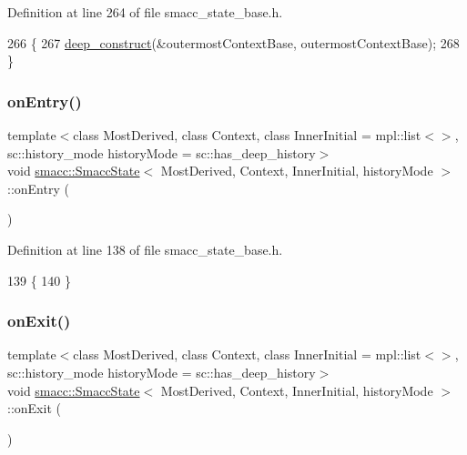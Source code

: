 Definition at line 264 of file smacc\+\_\+state\+\_\+base.\+h.


\begin{DoxyCode}
266     \{
267       \hyperlink{classsmacc_1_1SmaccState_aac23d8a6909f75c5e5fca2a7c09b5368}{deep\_construct}(&outermostContextBase, outermostContextBase);
268     \}
\end{DoxyCode}
\mbox{\label{classsmacc_1_1SmaccState_a4a10a74fdbe51a798b8d651668b8ed9a}} 
\subsubsection{\texorpdfstring{on\+Entry()}{onEntry()}}
{\footnotesize\ttfamily template$<$class Most\+Derived, class Context, class Inner\+Initial = mpl\+::list$<$$>$, sc\+::history\+\_\+mode history\+Mode = sc\+::has\+\_\+deep\+\_\+history$>$ \\
void \hyperlink{classsmacc_1_1SmaccState}{smacc\+::\+Smacc\+State}$<$ Most\+Derived, Context, Inner\+Initial, history\+Mode $>$\+::on\+Entry (\begin{DoxyParamCaption}{ }\end{DoxyParamCaption})\hspace{0.3cm}{\ttfamily [inline]}}



Definition at line 138 of file smacc\+\_\+state\+\_\+base.\+h.


\begin{DoxyCode}
139     \{
140     \}
\end{DoxyCode}
\mbox{\label{classsmacc_1_1SmaccState_a82ca7c69153e86dc5eedf3f909560f3a}} 
\subsubsection{\texorpdfstring{on\+Exit()}{onExit()}}
{\footnotesize\ttfamily template$<$class Most\+Derived, class Context, class Inner\+Initial = mpl\+::list$<$$>$, sc\+::history\+\_\+mode history\+Mode = sc\+::has\+\_\+deep\+\_\+history$>$ \\
void \hyperlink{classsmacc_1_1SmaccState}{smacc\+::\+Smacc\+State}$<$ Most\+Derived, Context, Inner\+Initial, history\+Mode $>$\+::on\+Exit (\begin{DoxyParamCaption}{ }\end{DoxyParamCaption})\hspace{0.3cm}{\ttfamily [inline]}}



